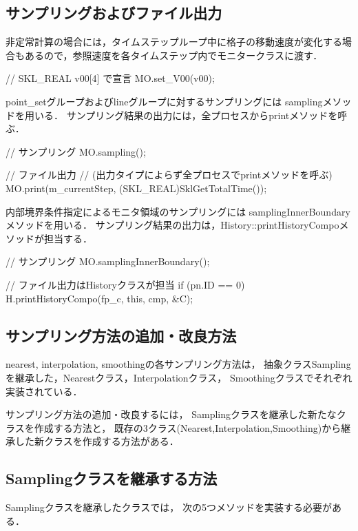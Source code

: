 %
\pagebreak
\subsection{サンプリングおよびファイル出力}

非定常計算の場合には，タイムステップループ中に格子の移動速度が変化する場合もあるので，参照速度を各タイムステップ内でモニタークラスに渡す．
{\small
\begin{program}
  // SKL_REAL v00[4] で宣言
  MO.set_V00(v00);
\end{program}
}

point\_setグループおよびlineグループに対するサンプリングには
samplingメソッドを用いる．
サンプリング結果の出力には，全プロセスからprintメソッドを呼ぶ．
{\small
\begin{program}
  // サンプリング
  MO.sampling();

  // ファイル出力
  // (出力タイプによらず全プロセスでprintメソッドを呼ぶ)
  MO.print(m_currentStep, (SKL_REAL)SklGetTotalTime());
\end{program}
}

内部境界条件指定によるモニタ領域のサンプリングには
samplingInnerBoundaryメソッドを用いる．
サンプリング結果の出力は，History::printHistoryCompoメソッドが担当する．
{\small
\begin{program}
  // サンプリング
  MO.samplingInnerBoundary();
  
  // ファイル出力はHistoryクラスが担当
  if (pn.ID == 0) H.printHistoryCompo(fp_c, this, cmp, &C);
\end{program}
}

%
\subsection{サンプリング方法の追加・改良方法}
nearest, interpolation, smoothingの各サンプリング方法は，
抽象クラスSamplingを継承した，Nearestクラス，Interpolationクラス，
Smoothingクラスでそれぞれ実装されている．

サンプリング方法の追加・改良するには，
Samplingクラスを継承した新たなクラスを作成する方法と，
既存の3クラス(Nearest,Interpolation,Smoothing)から継承した新クラスを作成する方法がある．

%
\subsection{Samplingクラスを継承する方法}
Samplingクラスを継承したクラスでは，
次の5つメソッドを実装する必要がある．

